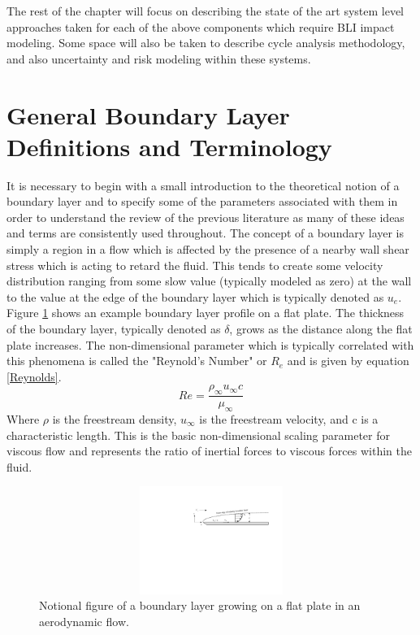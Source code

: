 \documentclass[12pt]{gatech-thesis}
\begin{document}
	The rest of the chapter will focus on describing the state of the art system level approaches taken for each of the above components which require BLI impact modeling.  Some space will also be taken to describe cycle analysis methodology, and also uncertainty and risk modeling within these systems.   

\section{General Boundary Layer Definitions and Terminology}
It is necessary to begin with a small introduction to the theoretical notion of a boundary layer and to specify some of the parameters associated with them in order to understand the review of the previous literature as many of these ideas and terms are consistently used throughout.  The concept of a boundary layer is simply a region in a flow which is affected by the presence of a nearby wall shear stress which is acting to retard the fluid.  This tends to create some velocity distribution ranging from some slow value (typically modeled as zero) at the wall to the value at the edge of the boundary layer which is typically denoted as $u_e$.  Figure \ref{Flat_Plate} shows an example boundary layer profile on a flat plate.  The thickness of the boundary layer, typically denoted as $\delta$, grows as the distance along the flat plate increases.  The non-dimensional parameter which is typically correlated with this phenomena is called the "Reynold's Number" or $R_e$ and is given by equation \ref{Reynolds}.  
\begin{equation} Re = \frac{{\rho_\infty} u_\infty c}{\mu_\infty}\label{Reynolds}\end{equation}
Where $\rho$ is the freestream density, $u_\infty$ is the freestream velocity, and c is a characteristic length.  This is the basic non-dimensional scaling parameter for viscous flow and represents the ratio of inertial forces to viscous forces within the fluid.  
\begin{figure}[htpb]
\centering
\includegraphics[width=180mm, height =35mm, trim=90mm 120mm 0mm 35mm, clip=true]{Figure3_flat_plate_BL.png}
\caption{Notional figure of a boundary layer growing on a flat plate in an aerodynamic flow.}
\label{Flat_Plate}
\end{figure}
\end{document}
